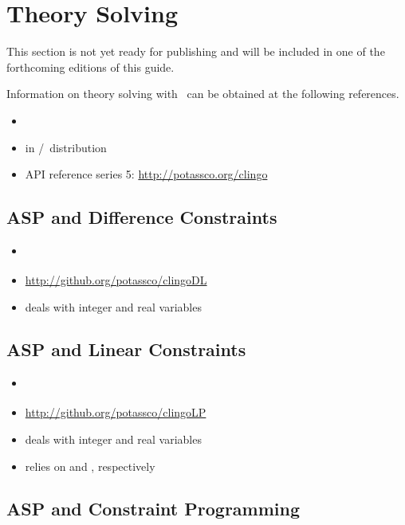 \section{Theory Solving}\label{sec:theory}

This section is not yet ready for publishing
and will be included in one of the forthcoming editions of this guide.

Information on theory solving with \clingo\ can be obtained at the following references.

\begin{itemize}
\item \cite{gekakaosscwa16a,kascwa17a}
\item {} in \gringo/\clingo\ distribution
\item API reference \clingo{} series 5: \url{http://potassco.org/clingo}
\end{itemize}

\subsection{ASP and Difference Constraints}
\label{sec:difference:constraints}

\begin{itemize}
\item \cite{jakaosscscwa17a}
\item \url{http://github.org/potassco/clingoDL}
\item deals with integer and real variables
\end{itemize}

\subsection{ASP and Linear Constraints}
\label{sec:linear:constraints}

\begin{itemize}
\item \cite{jakaosscscwa17a}
\item \url{http://github.org/potassco/clingoLP}
\item deals with integer and real variables
\item relies on \cplex{} and \lpsolve{}, respectively
\end{itemize}


\subsection{ASP and Constraint Programming}\label{sec:constraint}

